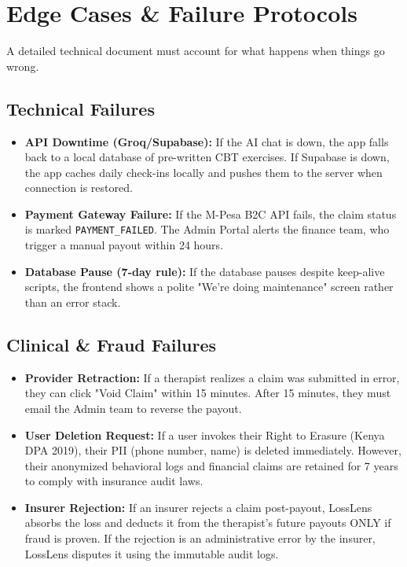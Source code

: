 \documentclass[11pt,a4paper]{article}
\begin{document}
\section{Edge Cases \& Failure Protocols}
A detailed technical document must account for what happens when things go wrong.

\subsection{Technical Failures}
\begin{itemize}
    \item \textbf{API Downtime (Groq/Supabase):} If the AI chat is down, the app falls back to a local database of pre-written CBT exercises. If Supabase is down, the app caches daily check-ins locally and pushes them to the server when connection is restored.
    \item \textbf{Payment Gateway Failure:} If the M-Pesa B2C API fails, the claim status is marked \texttt{PAYMENT\_FAILED}. The Admin Portal alerts the finance team, who trigger a manual payout within 24 hours.
    \item \textbf{Database Pause (7-day rule):} If the database pauses despite keep-alive scripts, the frontend shows a polite "We're doing maintenance" screen rather than an error stack.
\end{itemize}

\subsection{Clinical \& Fraud Failures}
\begin{itemize}
    \item \textbf{Provider Retraction:} If a therapist realizes a claim was submitted in error, they can click "Void Claim" within 15 minutes. After 15 minutes, they must email the Admin team to reverse the payout.
    \item \textbf{User Deletion Request:} If a user invokes their Right to Erasure (Kenya DPA 2019), their PII (phone number, name) is deleted immediately. However, their anonymized behavioral logs and financial claims are retained for 7 years to comply with insurance audit laws.
    \item \textbf{Insurer Rejection:} If an insurer rejects a claim post-payout, LossLens absorbs the loss and deducts it from the therapist's future payouts ONLY if fraud is proven. If the rejection is an administrative error by the insurer, LossLens disputes it using the immutable audit logs.
\end{itemize}
\end{document}
